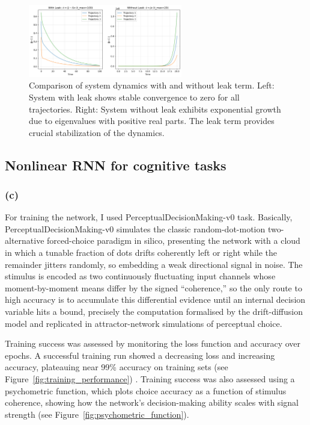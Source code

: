 \documentclass[11pt]{article}
\begin{document}
\begin{figure}[h]
\centering
\includegraphics[width=0.6\textwidth]{dynamics_comparison.png}
\caption{Comparison of system dynamics with and without leak term. Left: System with leak shows stable convergence to zero for all trajectories. Right: System without leak exhibits exponential growth due to eigenvalues with positive real parts. The leak term provides crucial stabilization of the dynamics.}
\label{fig:dynamics_comparison}
\end{figure}


\subsection*{Nonlinear RNN for cognitive tasks}

\subsubsection*{(c)}

For training the network, I used PerceptualDecisionMaking-v0 task.
Basically, PerceptualDecisionMaking-v0 simulates the classic random-dot-motion two-alternative forced-choice paradigm in silico, presenting the network with a cloud in which a tunable fraction of dots drifts coherently left or right while the remainder jitters randomly, so embedding a weak directional signal in noise. 
The stimulus is encoded as two continuously fluctuating input channels whose moment-by-moment means differ by the signed “coherence,” so the only route to high accuracy is to accumulate this differential evidence until an internal decision variable hits a bound, precisely the computation formalised by the drift-diffusion model and replicated in attractor-network simulations of perceptual choice.

Training success was assessed by monitoring the loss function and accuracy over epochs. 
A successful training run showed a decreasing loss and increasing accuracy, plateauing near 99\% accuracy on training sets (see Figure~\ref{fig:training_performance}) .
Training success was also assessed using a psychometric function, which plots choice accuracy as a function of stimulus coherence, showing how the network's decision-making ability scales with signal strength (see Figure~\ref{fig:psychometric_function}).
\end{document}
